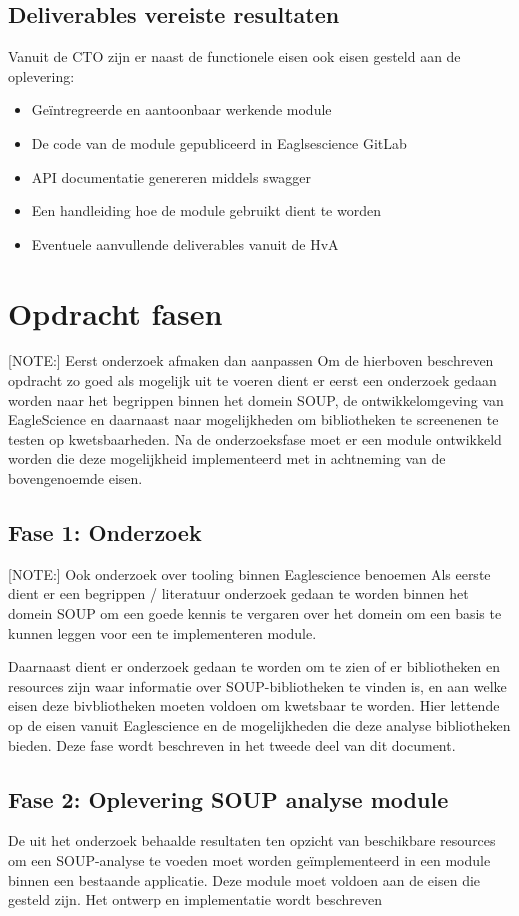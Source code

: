 \subsection{Deliverables vereiste resultaten}\label{subsec:deliverables-vereiste-resultaten}
Vanuit de CTO zijn er naast de functionele eisen ook eisen gesteld aan de oplevering:
\begin{itemize}
\item Geïntregreerde en aantoonbaar werkende module
\item De code van de module gepubliceerd in Eaglsescience GitLab
\item API documentatie genereren middels swagger
\item Een handleiding hoe de module gebruikt dient te worden
\item Eventuele aanvullende deliverables vanuit de HvA
\end{itemize}




\section{Opdracht fasen}\label{sec:opdracht-fasen}
[NOTE:] Eerst onderzoek afmaken dan aanpassen
Om de hierboven beschreven opdracht zo goed als mogelijk uit te voeren dient er eerst een onderzoek gedaan worden naar het begrippen binnen het domein SOUP, de ontwikkelomgeving van EagleScience en daarnaast naar mogelijkheden om bibliotheken te screenenen te testen op kwetsbaarheden.
Na de onderzoeksfase moet er een module ontwikkeld worden die deze mogelijkheid implementeerd met in achtneming van de bovengenoemde eisen.

\subsection{Fase 1: Onderzoek} \label{subsec:fase-1:-onderzoek}
[NOTE:] Ook onderzoek over tooling binnen Eaglescience benoemen
Als eerste dient er een begrippen / literatuur onderzoek gedaan te worden binnen het domein SOUP om een goede kennis te vergaren over het domein om een basis te kunnen leggen voor een te implementeren module.

Daarnaast dient er onderzoek gedaan te worden om te zien of er bibliotheken en resources zijn waar informatie over SOUP-bibliotheken te vinden is, en aan welke eisen deze bivbliotheken moeten voldoen om kwetsbaar te worden.
Hier lettende op de eisen vanuit Eaglescience en de mogelijkheden die deze analyse bibliotheken bieden.
Deze fase wordt beschreven in het tweede deel van dit document.

\subsection{Fase 2: Oplevering SOUP analyse module}\label{subsec:fase-2:-oplevering-soup-analyse-module}
De uit het onderzoek behaalde resultaten ten opzicht van beschikbare resources om een SOUP-analyse te voeden moet worden geïmplementeerd in een module binnen een bestaande applicatie.
Deze module moet voldoen aan de eisen die gesteld zijn.
Het ontwerp en implementatie wordt beschreven
